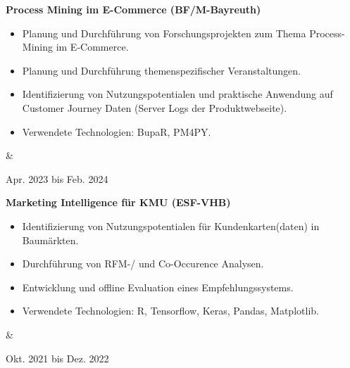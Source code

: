\documentclass[10pt, a4paper]{article}
\newenvironment{highlights}{
        \begin{itemize}[
                topsep=0pt,
                parsep=0.10 cm,
                partopsep=0pt,
                itemsep=0pt,
                after=\vspace{-1\baselineskip},
                leftmargin=0.4 cm + 3pt
            ]
    }{
        \end{itemize}
    } %
\let\originalTabularx\tabularx
\let\originalEndTabularx\endtabularx
\renewenvironment{tabularx}{\bgroup\centering\originalTabularx}{\originalEndTabularx\par\egroup}
\begin{document}
        \vspace{0.2 cm}
        \begin{tabularx}{
            \textwidth-0.4 cm-0.13cm
        }{
            K{0.2 cm}
            R{4.1 cm}
        }
            \textbf{Process Mining im E-Commerce (BF/M-Bayreuth)}

            \vspace{0.10 cm}

            \begin{highlights}
                \item Planung und Durchführung von Forschungsprojekten zum Thema Process-Mining im E-Commerce.
                \item Planung und Durchführung themenspezifischer Veranstaltungen.
                \item Identifizierung von Nutzungspotentialen und praktische Anwendung auf Customer Journey Daten (Server Logs der Produktwebseite).
                \item Verwendete Technologien: BupaR, PM4PY.
            \end{highlights}
            &
            

            Apr. 2023 bis Feb. 2024
        \end{tabularx}


        \vspace{0.2 cm}
        \begin{tabularx}{
            \textwidth-0.4 cm-0.13cm
        }{
            K{0.2 cm}
            R{4.1 cm}
        }
            \textbf{Marketing Intelligence für KMU (ESF-VHB)}

            \vspace{0.10 cm}

            \begin{highlights}
                \item Identifizierung von Nutzungspotentialen für Kundenkarten(daten) in Baumärkten.
                \item Durchführung von RFM-/ und Co-Occurence Analysen.
                \item Entwicklung und offline Evaluation eines Empfehlungssystems.
                \item Verwendete Technologien: R, Tensorflow, Keras, Pandas, Matplotlib.
            \end{highlights}
            &
            

            Okt. 2021 bis Dez. 2022
        \end{tabularx}
\end{document}
